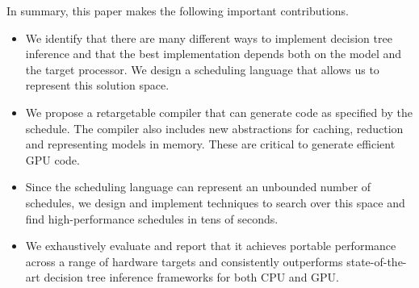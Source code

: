 In summary, this paper makes the following important contributions.
\begin{itemize}
  \item We identify that there are many different ways to implement  
  decision tree inference and that the best implementation depends both on the model
  and the target processor. We design a scheduling language that 
  allows us to represent this solution space. 
  \item We propose a retargetable compiler that can generate code as specified by 
  the schedule. The compiler also includes new abstractions for caching,
  reduction and representing models in memory. These are critical to generate 
  efficient GPU code.
  \item Since the scheduling language can represent an unbounded number of schedules, 
  we design and implement techniques to search over this space and find high-performance 
  schedules in tens of seconds. 
  \item We exhaustively evaluate \Treebeard{} and report that it achieves 
  portable performance across a range of hardware targets and consistently outperforms
  state-of-the-art decision tree inference frameworks for both CPU and GPU.
\end{itemize}

